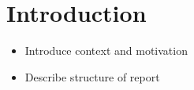 \section{Introduction}
\begin{itemize}
    \item Introduce context and motivation 
    \item Describe structure of report
\end{itemize}